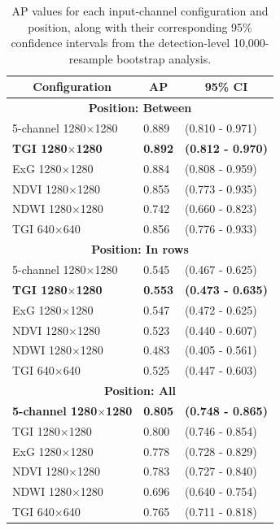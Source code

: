 \documentclass{ieeeaccess}
\begin{document}
\begin{table}[htbp]
\centering
\caption{AP values for each input-channel configuration and position, along with their corresponding 95\% confidence intervals from the detection-level 10{,}000-resample bootstrap analysis.}
\begin{tabular}{lll}
\toprule
\multicolumn{1}{c}{\textbf{Configuration}} & \multicolumn{1}{c}{\textbf{AP}} & \multicolumn{1}{c}{\textbf{95\% CI}} \\
\midrule
\multicolumn{3}{c}{\textbf{Position: Between}} \\
5-channel 1280$\times$1280 & 0.889 & (0.810 - 0.971) \\
\textbf{TGI 1280$\times$1280} & \textbf{0.892} & \textbf{(0.812 - 0.970)} \\
ExG 1280$\times$1280 & 0.884 & (0.808 - 0.959) \\
NDVI 1280$\times$1280 & 0.855 & (0.773 - 0.935) \\
NDWI 1280$\times$1280 & 0.742 & (0.660 - 0.823) \\
TGI 640$\times$640 & 0.856 & (0.776 - 0.933) \\
\midrule
\multicolumn{3}{c}{\textbf{Position: In rows}} \\
5-channel 1280$\times$1280 & 0.545 & (0.467 - 0.625) \\
\textbf{TGI 1280$\times$1280} & \textbf{0.553} & \textbf{(0.473 - 0.635)} \\
ExG 1280$\times$1280 & 0.547 & (0.472 - 0.625) \\
NDVI 1280$\times$1280 & 0.523 & (0.440 - 0.607) \\
NDWI 1280$\times$1280 & 0.483 & (0.405 - 0.561) \\
TGI 640$\times$640 & 0.525 & (0.447 - 0.603) \\
\midrule
\multicolumn{3}{c}{\textbf{Position: All}} \\
\textbf{5-channel 1280$\times$1280} & \textbf{0.805} & \textbf{(0.748 - 0.865)} \\
TGI 1280$\times$1280 & 0.800 & (0.746 - 0.854) \\
ExG 1280$\times$1280 & 0.778 & (0.728 - 0.829) \\
NDVI 1280$\times$1280 & 0.783 & (0.727 - 0.840) \\
NDWI 1280$\times$1280 & 0.696 & (0.640 - 0.754) \\
TGI 640$\times$640 & 0.765 & (0.711 - 0.818) \\
\bottomrule
\end{tabular}
\label{tab:performance_metrics_by_position}
\end{table}
\end{document}

